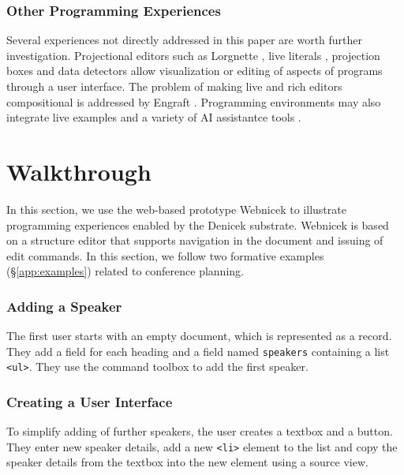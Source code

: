 \documentclass[sigconf,anonymous,screen]{acmart}
\newcommand*\circled[1]{\textnormal{\footnotesize\sffamily\bfseries\protect\tikz[baseline=(char.base)]{
  \node[shape=circle,fill=black,text=white,draw,inner sep=1pt] (char) {#1};}}}
\begin{document}
\subsubsection*{Other Programming Experiences}
Several experiences not directly addressed in this paper are worth further investigation.
Projectional editors such as Lorgnette \cite{gobert-2023-lorgnette},
live literals \cite{omar-2021-livelits}, projection boxes \cite{lerner-2020-boxes} and data detectors
\cite{nardi-1998-agents} allow visualization or editing of aspects of programs through a user interface.
The problem of making live and rich editors compositional is addressed by
Engraft \cite{horowitz-2023-engraft}. Programming environments may also integrate
live examples \cite{rauch-2019-babylonian} and a variety of AI assistantce tools \cite{petricek-2023-aias,blinn-2024-llms,mcnutt-2023-nbai}.



\section{Walkthrough}
\label{sec:walk}

In this section, we use the web-based prototype Webnicek to illustrate programming
experiences enabled by the Denicek substrate. Webnicek is based on a structure
editor that supports navigation in the document and issuing of edit commands. In this section, we follow two
formative examples (\S\ref{app:examples}) related to conference planning.

\subsubsection*{\circled{A} Adding a Speaker}
The first user starts with an empty document, which is represented as a record. They add a field for
each heading and a field named {\small\Verb_speakers_} containing a list {\small\Verb_<ul>_}. They
use the command toolbox to add the first speaker.

\subsubsection*{\circled{B} Creating a User Interface} To simplify adding of
further speakers, the user creates a textbox and a button. They enter new speaker
details, add a new {\small\Verb_<li>_} element to the list and copy the speaker details
from the textbox into the new element using a source view.
\end{document}
